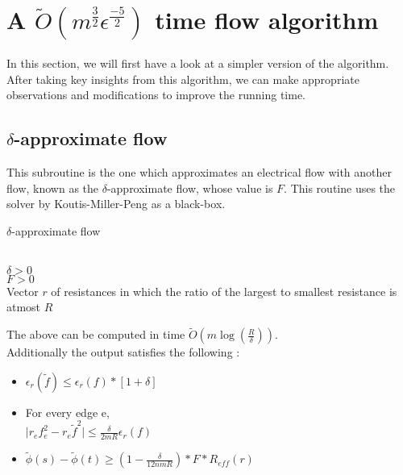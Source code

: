 \documentclass[BTech]{iitmdiss}
\begin{document}
	\section{A $\widetilde{O}(m^{\frac{3}{2}}\epsilon^{\frac{-5}{2}})$ time flow algorithm}
	  In this section, we will first have a look at a simpler version of the algorithm. After taking key insights from this algorithm,
	  we can make appropriate observations and modifications to improve the running time. \\
	  \subsection{$\delta$-approximate flow}
	    This subroutine is the one which approximates an electrical flow with another flow, known as the $\delta$-approximate flow, whose value is
	    $F$. This routine uses the solver by Koutis-Miller-Peng as a black-box.
	  
	  \begin{algorithm}[H]
	   \caption{$\delta$-approximate flow}
	   \KwIn
	      {\\
	      $\delta>0$\\
	      $F>0$ \\
	      Vector $r$ of resistances in which the ratio of the largest to smallest resistance is atmost $R$ \\
	      }
	    
	  \end{algorithm}

	    The above can be computed in time $\widetilde{O}(m \log(\frac{R}{\delta}))$. \\
	    Additionally the output satisfies the following : 
	  \begin{itemize}
	  \item 
	    $\epsilon_r(\widetilde{f}) \leq \epsilon_r(f)\ast [1+\delta]$
	  \item
	    For every edge e, \\
	    
	    $\mid r_e f_e^2 - r_e \widetilde{f}^2 \mid \leq \frac{\delta}{2mR}\epsilon_r(f)$
	  \item
	    $\widetilde{\phi}(s)-\widetilde{\phi}(t) \geq (1-\frac{\delta}{12nmR})\ast F \ast R_{eff}(r)$
	  \end{itemize}
	  
\end{document}
